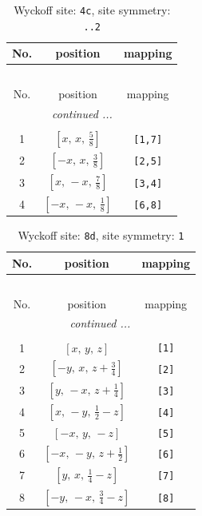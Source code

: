 \documentclass[fleqn,8pt]{jsarticle}
\begin{document}
\renewcommand{\arraystretch}{1.2}
\begin{longtable}{ccc}
\caption{Wyckoff site: {\tt 4c}, site symmetry: {\tt ..2}}
 \\
 \hline \hline
No. & position & mapping \\ \hline \endfirsthead

\multicolumn{2}{l}{\tablename\ \thetable{}} \\
 \hline \hline
No. & position & mapping \\ \hline \endhead

 \hline \hline
\multicolumn{2}{r}{\footnotesize\it continued ...} \\ \endfoot

 \hline \hline
\multicolumn{2}{r}{} \\ \endlastfoot

1 & $\left[ x,\, x,\, \frac{5}{8} \right]$ & {\tt [1,7]} \\ \hline
2 & $\left[ - x,\, x,\, \frac{3}{8} \right]$ & {\tt [2,5]} \\ \hline
3 & $\left[ x,\, - x,\, \frac{7}{8} \right]$ & {\tt [3,4]} \\ \hline
4 & $\left[ - x,\, - x,\, \frac{1}{8} \right]$ & {\tt [6,8]} \\
\end{longtable}
\renewcommand{\arraystretch}{1.2}
\begin{longtable}{ccc}
\caption{Wyckoff site: {\tt 8d}, site symmetry: {\tt 1}}
 \\
 \hline \hline
No. & position & mapping \\ \hline \endfirsthead

\multicolumn{2}{l}{\tablename\ \thetable{}} \\
 \hline \hline
No. & position & mapping \\ \hline \endhead

 \hline \hline
\multicolumn{2}{r}{\footnotesize\it continued ...} \\ \endfoot

 \hline \hline
\multicolumn{2}{r}{} \\ \endlastfoot

1 & $\left[ x,\, y,\, z \right]$ & {\tt [1]} \\ \hline
2 & $\left[ - y,\, x,\, z + \frac{3}{4} \right]$ & {\tt [2]} \\ \hline
3 & $\left[ y,\, - x,\, z + \frac{1}{4} \right]$ & {\tt [3]} \\ \hline
4 & $\left[ x,\, - y,\, \frac{1}{2} - z \right]$ & {\tt [4]} \\ \hline
5 & $\left[ - x,\, y,\, - z \right]$ & {\tt [5]} \\ \hline
6 & $\left[ - x,\, - y,\, z + \frac{1}{2} \right]$ & {\tt [6]} \\ \hline
7 & $\left[ y,\, x,\, \frac{1}{4} - z \right]$ & {\tt [7]} \\ \hline
8 & $\left[ - y,\, - x,\, \frac{3}{4} - z \right]$ & {\tt [8]} \\
\end{longtable}
\end{document}
